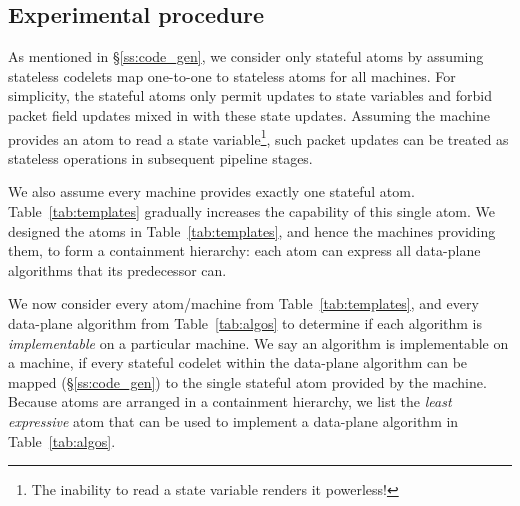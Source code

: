 \subsection{Experimental procedure}
As mentioned in \S\ref{ss:code_gen}, we consider only stateful atoms by
assuming stateless codelets map one-to-one to stateless atoms for all
\absmachine machines. For simplicity, the stateful atoms only permit updates to
state variables and forbid packet field updates mixed in with these state
updates.  Assuming the \absmachine machine provides an atom to read a state
variable\footnote{The inability to read a state variable renders it
powerless!}, such packet updates can be treated as stateless operations in
subsequent pipeline stages.

We also assume every \absmachine machine provides exactly one stateful atom.
Table~\ref{tab:templates} gradually increases the capability of this single
atom.  We designed the atoms in Table~\ref{tab:templates}, and hence the
\absmachine machines providing them, to form a containment hierarchy: each atom
can express all data-plane algorithms that its predecessor can.

We now consider every atom/\absmachine machine from Table~\ref{tab:templates},
and every data-plane algorithm from Table~\ref{tab:algos} to determine if each
algorithm is \textit{implementable} on a particular \absmachine machine. We say
an algorithm is implementable on a \absmachine machine, if every stateful
codelet within the data-plane algorithm can be mapped (\S\ref{ss:code_gen}) to
the single stateful atom provided by the \absmachine machine. Because atoms are
arranged in a containment hierarchy, we list the \textit{least expressive} atom
that can be used to implement a data-plane algorithm in Table~\ref{tab:algos}.

%
%
%

